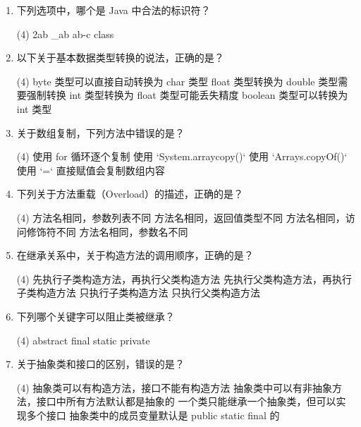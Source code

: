 \documentclass[a3paper, landscape, 11pt, twocolumn]{article}
\begin{document}
\begin{enumerate}[label=\arabic*., itemsep=0.8em]
	\item 下列选项中，哪个是 Java 中合法的标识符？
	      \begin{tasks}(4)
		      \task 2ab \task \_ab \task ab-c \task class
	      \end{tasks}

	\item 以下关于基本数据类型转换的说法，正确的是？
	      \begin{tasks}(4)
		      \task byte 类型可以直接自动转换为 char 类型
		      \task float 类型转换为 double 类型需要强制转换
		      \task int 类型转换为 float 类型可能丢失精度
		      \task boolean 类型可以转换为 int 类型
	      \end{tasks}

	\item 关于数组复制，下列方法中错误的是？
	      \begin{tasks}(4)
		      \task 使用 for 循环逐个复制
		      \task 使用 `System.arraycopy()`
		      \task 使用 `Arrays.copyOf()`
		      \task 使用 `=` 直接赋值会复制数组内容
	      \end{tasks}

	\item 下列关于方法重载（Overload）的描述，正确的是？
	      \begin{tasks}(4)
		      \task 方法名相同，参数列表不同
		      \task 方法名相同，返回值类型不同
		      \task 方法名相同，访问修饰符不同
		      \task 方法名相同，参数名不同
	      \end{tasks}

	\item 在继承关系中，关于构造方法的调用顺序，正确的是？
	      \begin{tasks}(4)
		      \task 先执行子类构造方法，再执行父类构造方法
		      \task 先执行父类构造方法，再执行子类构造方法
		      \task 只执行子类构造方法
		      \task 只执行父类构造方法
	      \end{tasks}

	\item 下列哪个关键字可以阻止类被继承？
	      \begin{tasks}(4)
		      \task abstract \task final \task static \task private
	      \end{tasks}

	\item 关于抽象类和接口的区别，错误的是？
	      \begin{tasks}(4)
		      \task 抽象类可以有构造方法，接口不能有构造方法
		      \task 抽象类中可以有非抽象方法，接口中所有方法默认都是抽象的
		      \task 一个类只能继承一个抽象类，但可以实现多个接口
		      \task 抽象类中的成员变量默认是 public static final 的
	      \end{tasks}


\end{enumerate}
\end{document}
